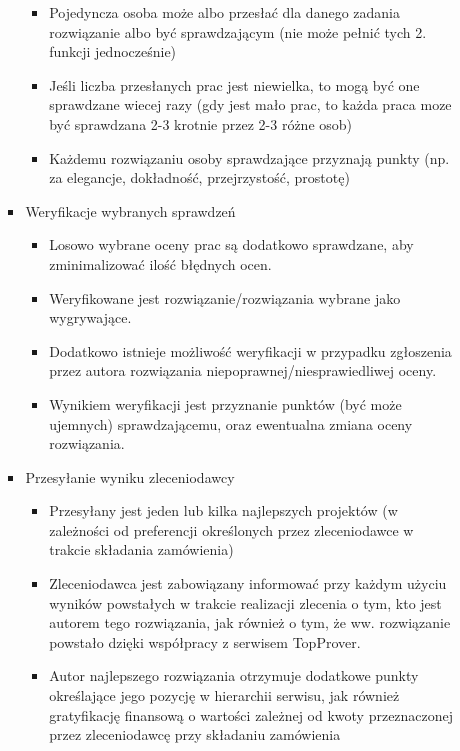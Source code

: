 \documentclass{article}
\begin{document}
\begin{enumerate}
\begin{enumerate}
\begin{itemize}
\begin{itemize}
	 \item Pojedyncza osoba może albo przesłać dla danego zadania rozwiązanie albo być sprawdzającym (nie może pełnić tych 2. funkcji jednocześnie)
	 \item Jeśli liczba przesłanych prac jest niewielka, to mogą być one sprawdzane wiecej razy (gdy jest mało prac, to każda praca moze być sprawdzana 2-3 krotnie przez 2-3 różne osob)
	 \item Każdemu rozwiązaniu osoby sprawdzające przyznają punkty (np. za elegancje, dokładność, przejrzystość, prostotę)
	\end{itemize}
      \item Weryfikacje wybranych sprawdzeń
      \begin{itemize}
	 \item Losowo wybrane oceny prac są dodatkowo sprawdzane, aby zminimalizować ilość błędnych ocen.
	 \item Weryfikowane jest rozwiązanie/rozwiązania wybrane jako wygrywające.
	 \item Dodatkowo istnieje możliwość weryfikacji w przypadku zgłoszenia przez autora rozwiązania niepoprawnej/niesprawiedliwej oceny.
	 \item Wynikiem weryfikacji jest przyznanie punktów (być może ujemnych) sprawdzającemu, oraz ewentualna zmiana oceny rozwiązania.
      \end{itemize}
      
      \item Przesyłanie wyniku zleceniodawcy
	\begin{itemize}
	 \item Przesyłany jest jeden lub kilka najlepszych projektów (w zależności od preferencji określonych przez zleceniodawce w trakcie składania zamówienia)
	 \item Zleceniodawca jest zabowiązany informować przy każdym użyciu wyników powstałych w trakcie realizacji zlecenia o tym, kto jest autorem tego rozwiązania,
	 jak również o tym, że ww. rozwiązanie powstało dzięki współpracy z serwisem TopProver.
	 \item Autor najlepszego rozwiązania otrzymuje dodatkowe punkty określające jego pozycję w hierarchii serwisu,
	 jak również gratyfikację finansową o wartości zależnej od kwoty przeznaczonej przez zleceniodawcę przy składaniu zamówienia
	\end{itemize}


\end{itemize}
\end{enumerate}
\end{enumerate}
\end{document}
